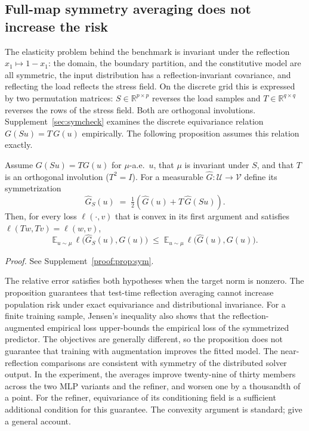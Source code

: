 \subsection{Full-map symmetry averaging does not increase the risk}
\label{sec:theory-sym}

The elasticity problem behind the benchmark is invariant under the reflection
$x_1\mapsto 1-x_1$: the domain, the boundary partition, and the constitutive
model are all symmetric, the input distribution has a reflection-invariant
covariance, and reflecting the load reflects the stress field. On the discrete
grid this is expressed by two permutation matrices: $S\in\mathbb R^{p\times p}$
reverses the load samples and $T\in\mathbb R^{q\times q}$ reverses the rows of
the stress field. Both are orthogonal involutions. Supplement~\ref{sec:symcheck}
examines the discrete equivariance relation $G(Su)=T\,G(u)$
empirically. The following proposition assumes this relation exactly.

\begin{proposition}[symmetrization]\label{prop:sym}
Assume $G(Su)=TG(u)$ for $\mu$-a.e.\ $u$, that $\mu$ is invariant under $S$,
and that $T$ is an orthogonal involution ($T^2=I$). For a measurable
$\widehat G:\mathcal U\to\mathcal V$ define its symmetrization
\[
\widehat G_S(u)\;=\;\tfrac12\left(\widehat G(u)+T\,\widehat G(Su)\right).
\]
Then, for every loss $\ell(\cdot,v)$ that is convex in its first argument and
satisfies $\ell(Tw,Tv)=\ell(w,v)$,
\[
\mathbb E_{u\sim\mu}\,\ell\big(\widehat G_S(u),G(u)\big)\;\le\;
\mathbb E_{u\sim\mu}\,\ell\big(\widehat G(u),G(u)\big).
\]
\end{proposition}
\noindent\emph{Proof.} See Supplement~\ref{proof:prop:sym}.


The relative error satisfies both hypotheses when the target norm is
nonzero. The proposition guarantees that test-time reflection averaging
cannot increase population risk under exact equivariance and distributional
invariance. For a finite training sample, Jensen's inequality also shows that
the reflection-augmented empirical loss upper-bounds the empirical loss of
the symmetrized predictor. The objectives are generally different, so the
proposition does not guarantee that training with augmentation improves the
fitted model. The near-reflection comparisons are consistent with symmetry of the
distributed solver output. In the experiment, the averages improve twenty-nine of thirty members across the two MLP variants
and the refiner, and worsen one by a thousandth of a point. For the refiner, equivariance of its conditioning field is a sufficient
additional condition for this guarantee. The convexity
argument is standard; \citet{lyle2020benefits} give a general account.

